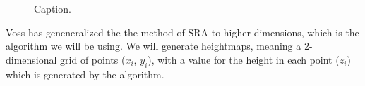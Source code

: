 \begin{figure}
    \centering
    
    \caption{
        Caption.
        \label{fig:midpoint01}
    }
\end{figure}

%     

Voss has geneneralized the the method of SRA to higher dimensions\cite{voss1985random}, which is the algorithm we will be using. We will generate heightmaps, meaning a 2-dimensional grid of points ($x_i$, $y_i$), with a value for the height in each point ($z_i$) which is generated by the algorithm.


